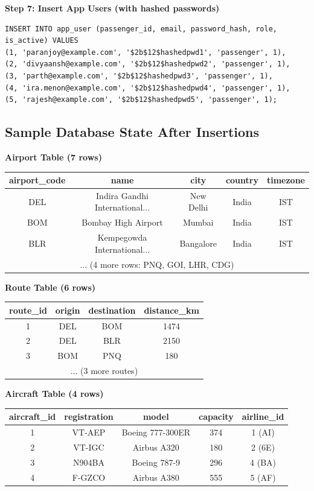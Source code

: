\documentclass[12pt, a4paper]{article}
\begin{document}
\textbf{Step 7: Insert App Users (with hashed passwords)}
\begin{lstlisting}[style=sqlstyle]
INSERT INTO app_user (passenger_id, email, password_hash, role, is_active) VALUES
(1, 'paranjoy@example.com', '$2b$12$hashedpwd1', 'passenger', 1),
(2, 'divyaansh@example.com', '$2b$12$hashedpwd2', 'passenger', 1),
(3, 'parth@example.com', '$2b$12$hashedpwd3', 'passenger', 1),
(4, 'ira.menon@example.com', '$2b$12$hashedpwd4', 'passenger', 1),
(5, 'rajesh@example.com', '$2b$12$hashedpwd5', 'passenger', 1);
\end{lstlisting}

\subsection{Sample Database State After Insertions}

\textbf{Airport Table (7 rows)}
\begin{center}
\small
\begin{tabular}{|c|c|c|c|c|}
\hline
\textbf{airport\_code} & \textbf{name} & \textbf{city} & \textbf{country} & \textbf{timezone} \\
\hline
DEL & Indira Gandhi International... & New Delhi & India & IST \\
\hline
BOM & Bombay High Airport & Mumbai & India & IST \\
\hline
BLR & Kempegowda International... & Bangalore & India & IST \\
\hline
\multicolumn{5}{|c|}{... (4 more rows: PNQ, GOI, LHR, CDG)} \\
\hline
\end{tabular}
\end{center}

\textbf{Route Table (6 rows)}
\begin{center}
\small
\begin{tabular}{|c|c|c|c|}
\hline
\textbf{route\_id} & \textbf{origin} & \textbf{destination} & \textbf{distance\_km} \\
\hline
1 & DEL & BOM & 1474 \\
\hline
2 & DEL & BLR & 2150 \\
\hline
3 & BOM & PNQ & 180 \\
\hline
\multicolumn{4}{|c|}{... (3 more routes)} \\
\hline
\end{tabular}
\end{center}

\textbf{Aircraft Table (4 rows)}
\begin{center}
\small
\begin{tabular}{|c|c|c|c|c|}
\hline
\textbf{aircraft\_id} & \textbf{registration} & \textbf{model} & \textbf{capacity} & \textbf{airline\_id} \\
\hline
1 & VT-AEP & Boeing 777-300ER & 374 & 1 (AI) \\
\hline
2 & VT-IGC & Airbus A320 & 180 & 2 (6E) \\
\hline
3 & N904BA & Boeing 787-9 & 296 & 4 (BA) \\
\hline
4 & F-GZCO & Airbus A380 & 555 & 5 (AF) \\
\hline
\end{tabular}
\end{center}
\end{document}
